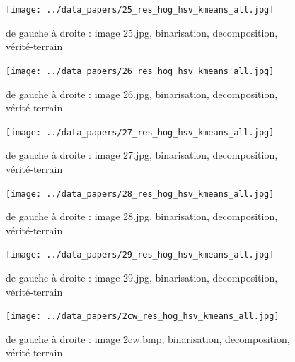 \documentclass{book}
\begin{document}
\begin{figure}[H]
\begin{center}
\texttt{[image: ../data\_papers/25\_res\_hog\_hsv\_kmeans\_all.jpg]}
\end{center}
\caption{de gauche à droite : image 25.jpg, binarisation, decomposition, vérité-terrain}
\label{25}
\end{figure}
\clearpage


\begin{figure}[H]
\begin{center}
\texttt{[image: ../data\_papers/26\_res\_hog\_hsv\_kmeans\_all.jpg]}
\end{center}
\caption{de gauche à droite : image 26.jpg, binarisation, decomposition, vérité-terrain}
\label{26}
\end{figure}
\clearpage


\begin{figure}[H]
\begin{center}
\texttt{[image: ../data\_papers/27\_res\_hog\_hsv\_kmeans\_all.jpg]}
\end{center}
\caption{de gauche à droite : image 27.jpg, binarisation, decomposition, vérité-terrain}
\label{27}
\end{figure}
\clearpage


\begin{figure}[H]
\begin{center}
\texttt{[image: ../data\_papers/28\_res\_hog\_hsv\_kmeans\_all.jpg]}
\end{center}
\caption{de gauche à droite : image 28.jpg, binarisation, decomposition, vérité-terrain}
\label{28}
\end{figure}
\clearpage


\begin{figure}[H]
\begin{center}
\texttt{[image: ../data\_papers/29\_res\_hog\_hsv\_kmeans\_all.jpg]}
\end{center}
\caption{de gauche à droite : image 29.jpg, binarisation, decomposition, vérité-terrain}
\label{29}
\end{figure}
\clearpage


\begin{figure}[H]
\begin{center}
\texttt{[image: ../data\_papers/2cw\_res\_hog\_hsv\_kmeans\_all.jpg]}
\end{center}
\caption{de gauche à droite : image 2cw.bmp, binarisation, decomposition, vérité-terrain}
\label{2cw}
\end{figure}
\clearpage
\end{document}

